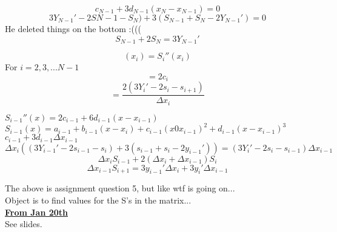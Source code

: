 \documentclass[12pt]{article}
\newcommand{\myt}[1]{\textbf{\underline{#1}}}
\begin{document}
	$$c_{N-1} + 3d_{N-1}(x_N - x_{N-1}) = 0$$
	$$3Y_{N-1}' - 2S{N-1} - S_N) + 3(S_{N-1} + S_N - 2Y_{N-1}') = 0$$
	He deleted things on the bottom :(((\\
	$$S_{N-1} + 2S_{N} = 3Y_{N-1}'$$
	
	$$(x_i) = S_i''(x_i)$$
	For $i = 2,3,...N-1$\\
	$$= 2c_i$$
	$$= \frac{2(3Y_i' - 2s_i - s_{i+1})}{\Delta x_i}$$
	
	$S_{i-1}''(x) = 2c_{i-1} + 6d_{i-1}(x-x_{i-1})$\\
	$S_{i-1}(x) = a_{i-1} + b_{i-1}(x-x_i) + c_{i-1}(x0x_{i-1})^2 + d_{i-1}(x-x_{i-1})^3$\\
	
	$c_{i-1} + 3d_{i-1}\Delta x_{i-1}$\\
	$$\Delta x_i((3Y_{i-1}' - 2s_{i-1}-s_{i}) + 3(s_{i-1} + s_i - 2y_{i-1}')) = (3Y_i' - 2s_i - s_{i-1})\Delta x_{i-1}$$
	$$\Delta x_iS_{i-1} + 2(\Delta x_i + \Delta x_{i-1})S_i$$
	$$\Delta x_{i-1}S_{i+1} = 3y_{i-1}'\Delta x_i + 3y_i'\Delta x_{i-1}$$
	
	The above is assignment question 5, but like wtf is going on...\\
	Object is to find values for the S's in the matrix...\\
	
	\myt{From Jan 20th}\\
	
	See slides.
	
	
	

	
	
	
	
	
\end{document}
